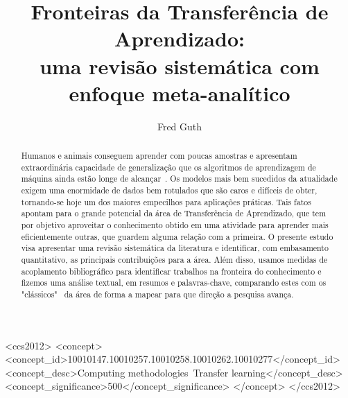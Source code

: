 \documentclass[sigconf]{acmart}
\begin{document}
%
\title[Fronteiras da Transferência de Aprendizado: uma revisão sistemática com enfoque meta-analítico]{Fronteiras da Transferência de Aprendizado: \\
uma revisão sistemática com enfoque meta-analítico}
%

\author{Fred Guth}

\renewcommand{\shortauthors}{Guth, F.}

\begin{abstract}
  Humanos e animais conseguem aprender com poucas amostras e apresentam extraordinária capacidade de generalização que os algoritmos de aprendizagem de máquina ainda estão longe de alcançar~\cite{goodfellow}. Os modelos mais bem sucedidos da atualidade exigem uma enormidade de dados bem rotulados que são caros e difíceis de obter, tornando-se hoje um dos maiores empecilhos para aplicações práticas. Tais fatos apontam para o grande potencial da área de Transferência de Aprendizado, que tem por objetivo aproveitar o conhecimento obtido em uma atividade para aprender mais eficientemente outras, que guardem alguma relação com a primeira. O presente estudo visa apresentar uma revisão sistemática da literatura e identificar, com embasamento quantitativo, as principais contribuições para a área. Além disso, usamos medidas de acoplamento bibliográfico para identificar trabalhos na fronteira do conhecimento e fizemos uma análise textual, em resumos e palavras-chave, comparando estes com os "clássicos" ~da área de forma a mapear para que direção a pesquisa avança.  
\end{abstract}


\begin{CCSXML}
<ccs2012>
 <concept>
 <concept_id>10010147.10010257.10010258.10010262.10010277</concept_id>
 <concept_desc>Computing methodologies~Transfer learning</concept_desc>
 <concept_significance>500</concept_significance>
 </concept>
</ccs2012>
\end{CCSXML}



\maketitle
\end{document}
